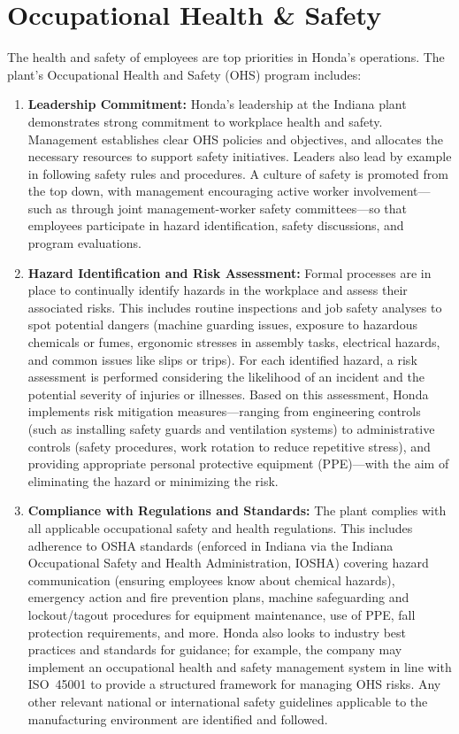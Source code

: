 \section{Occupational Health \& Safety}
The health and safety of employees are top priorities in Honda's operations. The plant’s Occupational Health and Safety (OHS) program includes:
\begin{enumerate}
    \item \textbf{Leadership Commitment:} Honda’s leadership at the Indiana plant demonstrates strong commitment to workplace health and safety. Management establishes clear OHS policies and objectives, and allocates the necessary resources to support safety initiatives. Leaders also lead by example in following safety rules and procedures. A culture of safety is promoted from the top down, with management encouraging active worker involvement---such as through joint management-worker safety committees---so that employees participate in hazard identification, safety discussions, and program evaluations.
    \item \textbf{Hazard Identification and Risk Assessment:} Formal processes are in place to continually identify hazards in the workplace and assess their associated risks. This includes routine inspections and job safety analyses to spot potential dangers (machine guarding issues, exposure to hazardous chemicals or fumes, ergonomic stresses in assembly tasks, electrical hazards, and common issues like slips or trips). For each identified hazard, a risk assessment is performed considering the likelihood of an incident and the potential severity of injuries or illnesses. Based on this assessment, Honda implements risk mitigation measures—ranging from engineering controls (such as installing safety guards and ventilation systems) to administrative controls (safety procedures, work rotation to reduce repetitive stress), and providing appropriate personal protective equipment (PPE)—with the aim of eliminating the hazard or minimizing the risk.
    \item \textbf{Compliance with Regulations and Standards:} The plant complies with all applicable occupational safety and health regulations. This includes adherence to OSHA standards (enforced in Indiana via the Indiana Occupational Safety and Health Administration, IOSHA) covering hazard communication (ensuring employees know about chemical hazards), emergency action and fire prevention plans, machine safeguarding and lockout/tagout procedures for equipment maintenance, use of PPE, fall protection requirements, and more. Honda also looks to industry best practices and standards for guidance; for example, the company may implement an occupational health and safety management system in line with ISO~45001 to provide a structured framework for managing OHS risks. Any other relevant national or international safety guidelines applicable to the manufacturing environment are identified and followed.

\end{enumerate}
